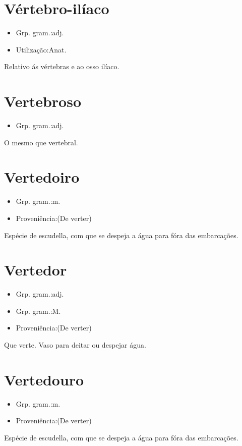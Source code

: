 \documentclass{article}
\begin{document}
\section{Vértebro-ilíaco}
\begin{itemize}
\item {Grp. gram.:adj.}
\end{itemize}
\begin{itemize}
\item {Utilização:Anat.}
\end{itemize}
Relativo ás vértebras e ao osso ilíaco.
\section{Vertebroso}
\begin{itemize}
\item {Grp. gram.:adj.}
\end{itemize}
O mesmo que \textunderscore vertebral\textunderscore .
\section{Vertedoiro}
\begin{itemize}
\item {Grp. gram.:m.}
\end{itemize}
\begin{itemize}
\item {Proveniência:(De \textunderscore verter\textunderscore )}
\end{itemize}
Espécie de escudella, com que se despeja a água para fóra das embarcações.
\section{Vertedor}
\begin{itemize}
\item {Grp. gram.:adj.}
\end{itemize}
\begin{itemize}
\item {Grp. gram.:M.}
\end{itemize}
\begin{itemize}
\item {Proveniência:(De \textunderscore verter\textunderscore )}
\end{itemize}
Que verte.
Vaso para deitar ou despejar água.
\section{Vertedouro}
\begin{itemize}
\item {Grp. gram.:m.}
\end{itemize}
\begin{itemize}
\item {Proveniência:(De \textunderscore verter\textunderscore )}
\end{itemize}
Espécie de escudella, com que se despeja a água para fóra das embarcações.
\end{document}
